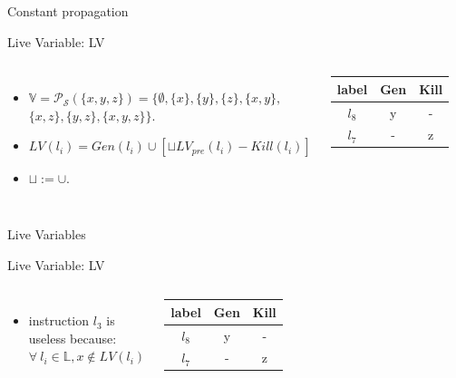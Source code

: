 \begin{frame}{Constant propagation}
\begin{exampleblock}{Live Variable: LV}
	\begin{columns}
		\begin{itemize}
			\small
			\item $\mathbb{V} = \mathcal{P_S}( \{x,y,z\} ) = \{\emptyset, \{x\}, \{y\}, \{z\}, \{x,y\},$\\ $\{x,z\},\{y,z\}, \{x,y,z\} \}$. 
			\item $LV(l_i)= Gen(l_i) \cup [ \sqcup LV_{pre}(l_i)-Kill(l_i) ] $
			\item $\sqcup := \cup$.
		\end{itemize}
		\begin{tabular}{c|c|c}
			label & Gen & Kill \\
			\hline
			$l_8$ & y & - \\
			\hline
			$l_7$ & - & z \\
			\hline
		\end{tabular}
		
		
	\end{columns}	
\end{exampleblock}
\end{frame}



\begin{frame}{Live Variables}
\begin{exampleblock}{Live Variable: LV}
	\begin{columns}
		\column{0.45\linewidth}
		\begin{itemize}
			\small
			\item instruction $l_3$ is useless because:\\
			$\forall~l_i \in \mathbb{L}, x \notin LV(l_i)$
		\end{itemize}
		\begin{tabular}{c|c|c}
			label & Gen & Kill \\
			\hline
			$l_8$ & y & - \\
			\hline
			$l_7$ & - & z \\
			\hline
		\end{tabular}
		
		\column{0.55\linewidth}
		
	\end{columns}	
\end{exampleblock}
\end{frame}


